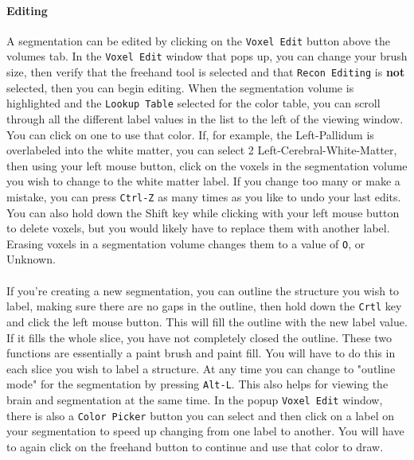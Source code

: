 \documentclass[paper=a4, fontsize=11pt]{scrartcl} %
\numberwithin{equation}{section} %
\numberwithin{figure}{section} %
\numberwithin{table}{section} %
\begin{document}
\paragraph{Editing} A segmentation can be edited by clicking on the \texttt{Voxel Edit} button above the volumes tab. In the \texttt{Voxel Edit} window that pops up, you can change your brush size, then verify that the freehand tool is selected and that \texttt{Recon Editing} is \textbf{not} selected, then you can begin editing. When the segmentation volume is highlighted and the \texttt{Lookup Table} selected for the color table, you can scroll through all the different label values in the list to the left of the viewing window. You can click on one to use that color. If, for example, the Left-Pallidum is overlabeled into the white matter, you can select 2 Left-Cerebral-White-Matter, then using your left mouse button, click on the voxels in the segmentation volume you wish to change to the white matter label. If you change too many or make a mistake, you can press \texttt{Ctrl-Z} as many times as you like to undo your last edits. You can also hold down the Shift key while clicking with your left mouse button to delete voxels, but you would likely have to replace them with another label. Erasing voxels in a segmentation volume changes them to a value of \texttt{O}, or Unknown.

\paragraph{} If you're creating a new segmentation, you can outline the structure you wish to label, making sure there are no gaps in the outline, then hold down the \texttt{Crtl} key and click the left mouse button. This will fill the outline with the new label value. If it fills the whole slice, you have not completely closed the outline. These two functions are essentially a paint brush and paint fill. You will have to do this in each slice you wish to label a structure.  At any time you can change to "outline mode" for the segmentation by pressing \texttt{Alt-L}. This also helps for viewing the brain and segmentation at the same time. In the popup \texttt{Voxel Edit} window, there is also a \texttt{Color Picker} button you can select and then click on a label on your segmentation to speed up changing from one label to another. You will have to again click on the freehand button to continue and use that color to draw.
\end{document}
